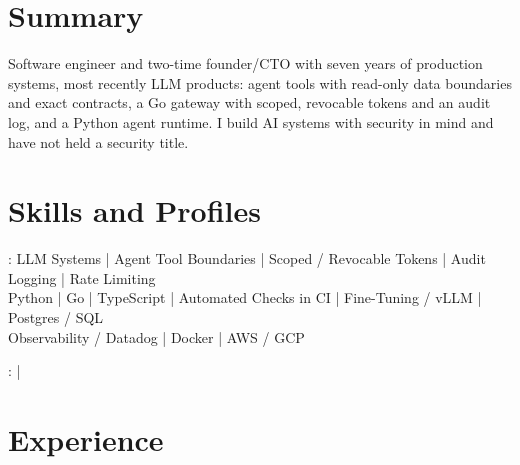 \documentclass[print]{jack-resume}
\begin{document}
\pagecolor{darkmodeBackground}


\begin{minipage}[t][1cm][t]{.03\textwidth}
    \hfill
\end{minipage}

\section{Summary}
Software engineer and two-time founder/CTO with seven years of production systems, most recently LLM products: agent tools with read-only data boundaries and exact contracts, a Go gateway with scoped, revocable tokens and an audit log, and a Python agent runtime. I build AI systems with security in mind and have not held a security title.
\sectionsep

\section{Skills and Profiles}
:
LLM Systems \hfill | \hfill
Agent Tool Boundaries \hfill | \hfill
Scoped / Revocable Tokens \hfill | \hfill
Audit Logging \hfill | \hfill
Rate Limiting \\
\hspace{1.0cm} Python \hfill | \hfill
Go \hfill | \hfill
TypeScript \hfill | \hfill
Automated Checks in CI \hfill | \hfill
Fine-Tuning / vLLM \hfill | \hfill
Postgres / SQL \\
\hspace{1.0cm} Observability / Datadog \hfill | \hfill
Docker \hfill | \hfill
AWS / GCP \\

\raggedright{
    :
      \href{https://www.linkedin.com/in/jack-sturtevant/}{ \ExternalLink} |
     \href{https://github.com/jacksturt}{ \ExternalLink}}

\section{Experience}
\end{document}
